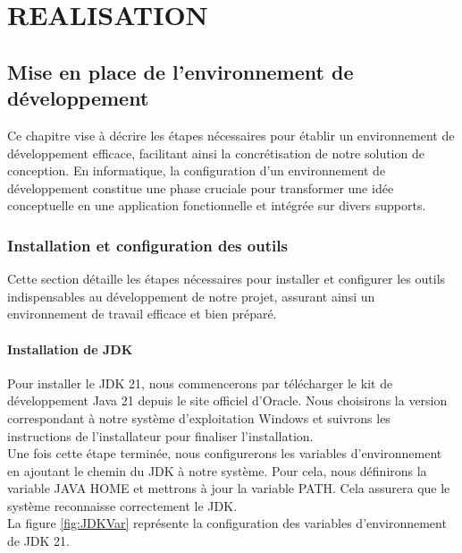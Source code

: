 \documentclass[12pt]{report}
\begin{document}
			\part{REALISATION}

			\chapter{Mise en place de l’environnement de développement}

			\hspace{15pt} Ce chapitre vise à décrire les étapes nécessaires pour établir un environnement de développement efficace, facilitant ainsi la concrétisation de notre solution de conception. En informatique, la configuration d’un environnement de développement constitue une phase cruciale pour transformer une idée conceptuelle en une application fonctionnelle et intégrée sur divers supports.
			
			\section{Installation et configuration des outils}
			
			\hspace{15pt} Cette section détaille les étapes nécessaires pour installer et configurer les outils indispensables au développement de notre projet, assurant ainsi un environnement de travail efficace et bien préparé.

			\subsection{Installation de JDK}

			\hspace{15pt} Pour installer le JDK 21, nous commencerons par télécharger le kit de développement Java 21 depuis le site officiel d'Oracle. Nous choisirons la version correspondant à notre système d'exploitation Windows et suivrons les instructions de l'installateur pour finaliser l'installation.\\

			Une fois cette étape terminée, nous configurerons les variables d'environnement en ajoutant le chemin du JDK à notre système. Pour cela, nous définirons la variable JAVA HOME et mettrons à jour la variable PATH. Cela assurera que le système reconnaisse correctement le JDK.\\

			La figure \ref{fig:JDKVar} représente la configuration des variables d'environnement de JDK 21.
\end{document}

